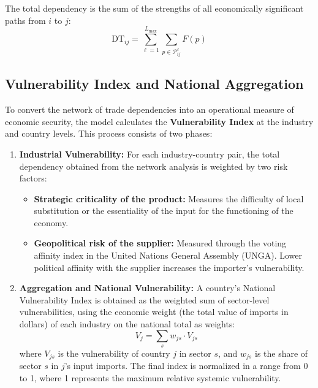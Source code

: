 \documentclass[final,1p,times,authoryear]{elsarticle}
\begin{document}
The total dependency is the sum of the strengths of all economically significant paths from $i$ to $j$:
\begin{equation}
\text{DT}_{ij} = \sum_{\ell=1}^{L_{\max}} \sum_{p \in \mathcal{P}_{ij}^{\ell}} F(p)
\end{equation}

\subsection{Vulnerability Index and National Aggregation}
To convert the network of trade dependencies into an operational measure of economic security, the model calculates the \textbf{Vulnerability Index} at the industry and country levels. This process consists of two phases:

\begin{enumerate}
    \item \textbf{Industrial Vulnerability:} For each industry-country pair, the total dependency obtained from the network analysis is weighted by two risk factors:
    \begin{itemize}
        \item \textbf{Strategic criticality of the product:} Measures the difficulty of local substitution or the essentiality of the input for the functioning of the economy.
        \item \textbf{Geopolitical risk of the supplier:} Measured through the voting affinity index in the United Nations General Assembly (UNGA). Lower political affinity with the supplier increases the importer's vulnerability.
    \end{itemize}
    
    \item \textbf{Aggregation and National Vulnerability:} A country's National Vulnerability Index is obtained as the weighted sum of sector-level vulnerabilities, using the economic weight (the total value of imports in dollars) of each industry on the national total as weights:
    \begin{equation}
    V_j = \sum_{s} w_{js} \cdot V_{js}
    \end{equation}
    where $V_{js}$ is the vulnerability of country $j$ in sector $s$, and $w_{js}$ is the share of sector $s$ in $j$'s input imports. The final index is normalized in a range from 0 to 1, where 1 represents the maximum relative systemic vulnerability.
\end{enumerate}
\end{document}
